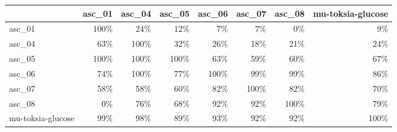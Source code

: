 \begin{tabular}{lrrrrrrr}
\toprule
 & asc_01 & asc_04 & asc_05 & asc_06 & asc_07 & asc_08 & mu-toksia-glucose \\
\midrule
asc_01 & 100\% & 24\% & 12\% & 7\% & 7\% & 0\% & 9\% \\
asc_04 & 63\% & 100\% & 32\% & 26\% & 18\% & 21\% & 24\% \\
asc_05 & 100\% & 100\% & 100\% & 63\% & 59\% & 60\% & 67\% \\
asc_06 & 74\% & 100\% & 77\% & 100\% & 99\% & 99\% & 86\% \\
asc_07 & 58\% & 58\% & 60\% & 82\% & 100\% & 82\% & 70\% \\
asc_08 & 0\% & 76\% & 68\% & 92\% & 92\% & 100\% & 79\% \\
mu-toksia-glucose & 99\% & 98\% & 89\% & 93\% & 92\% & 92\% & 100\% \\
\bottomrule
\end{tabular}
